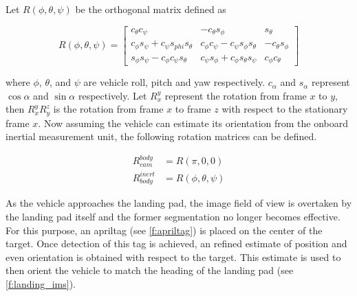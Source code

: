 Let $R\left(\phi, \theta, \psi\right)$ be the orthogonal matrix defined as

\begin{equation}
    R(\phi,\theta,\psi) = 
    \begin{bmatrix}
            c_{\theta}c_{\psi}                           & -c_{\theta}s_{\phi}                           & s_{\theta}\\
            c_{\phi}s_{\psi} + c_{\psi}s_{phi}s_{\theta} & c_{\phi}c_{\psi} - c_{\psi}s_{\phi}s_{\theta} & -c_{\theta}s_{\phi}\\
            s_{\phi}s_{\psi} -c_{\phi}c_{\psi}s_{\theta} & c_{\psi}s_{\phi} + c_{\phi}s_{\theta}s_{\psi} & c_{\phi}c_{\theta}
    \end{bmatrix}
\end{equation}

where $\phi$, $\theta$, and $\psi$ are vehicle roll, pitch and yaw respectively. $c_{\alpha}$ and $s_{\alpha}$
represent $\cos{\alpha}$ and $\sin{\alpha}$ respectively. Let $R_x^y$ represent the rotation from frame $x$ to
$y$, then $R_x^yR_y^z$ is the rotation from frame $x$ to frame $z$ with respect to the stationary frame $x$.
Now assuming the vehicle can estimate its orientation from the onboard inertial measurement unit, the
following rotation matrices can be defined.

\begin{align}
    R_{cam}^{body}   & = R(\pi, 0, 0)\label{e:rot_cam_bod}\\
    R_{body}^{inert} & = R(\phi, \theta, \psi)\label{e:rot_body_inert}
\end{align}

As the vehicle approaches the landing pad, the image field of view is overtaken by the landing pad itself and
the former segmentation no longer becomes effective. For this purpose, an apriltag\cite{olson2011tags} (see
\cref{f:apriltag}) is placed on the center of the target. Once detection of this tag is achieved, an refined
estimate of position and even orientation is obtained with respect to the target. This estimate is used to
then orient the vehicle to match the heading of the landing pad (see \cref{f:landing_ims}).

